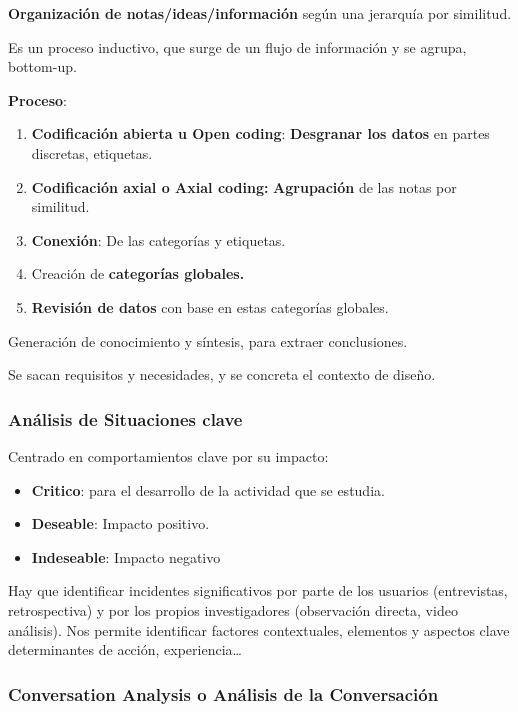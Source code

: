 \textbf{Organización de notas/ideas/información} según una jerarquía por
similitud.

Es un proceso inductivo, que surge de un flujo de información y se
agrupa, bottom-up.

\textbf{Proceso}:

\begin{enumerate}
\def\labelenumi{\arabic{enumi}.}
\tightlist
\item
  \textbf{Codificación abierta u Open coding}: \textbf{Desgranar los
  datos} en partes discretas, etiquetas.
\item
  \textbf{Codificación axial o Axial coding:} \textbf{Agrupación} de las
  notas por similitud.
\item
  \textbf{Conexión}: De las categorías y etiquetas.
\item
  Creación de \textbf{categorías globales.}
\item
  \textbf{Revisión de datos} con base en estas categorías globales.
\end{enumerate}

Generación de conocimiento y síntesis, para extraer conclusiones.

Se sacan requisitos y necesidades, y se concreta el contexto de diseño.

\hypertarget{anuxe1lisis-de-situaciones-clave}{%
\subsubsection{Análisis de Situaciones
clave}\label{anuxe1lisis-de-situaciones-clave}}

Centrado en comportamientos clave por su impacto:

\begin{itemize}
\tightlist
\item
  \textbf{Critico}: para el desarrollo de la actividad que se estudia.
\item
  \textbf{Deseable}: Impacto positivo.
\item
  \textbf{Indeseable}: Impacto negativo
\end{itemize}

Hay que identificar incidentes significativos por parte de los usuarios
(entrevistas, retrospectiva) y por los propios investigadores
(observación directa, video análisis). Nos permite identificar factores
contextuales, elementos y aspectos clave determinantes de acción,
experiencia\ldots{}

\hypertarget{conversation-analysis-o-anuxe1lisis-de-la-conversaciuxf3n}{%
\subsubsection{Conversation Analysis o Análisis de la
Conversación}\label{conversation-analysis-o-anuxe1lisis-de-la-conversaciuxf3n}}

